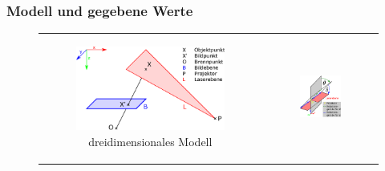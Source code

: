 \documentclass[ngerman,a4paper,parskip=half]{scrartcl}
\begin{document}
\subsubsection{Modell und gegebene Werte}

\begin{figure}
	\centering
	\begin{tabular}{cc}
		\begin{subfigure}{0.45\textwidth}
			\includegraphics[width=\textwidth]{includes/triangulation3d}
			\caption{dreidimensionales Modell}
			\label{fig:triangulation3d}
		\end{subfigure}
		& \multirow{-5}{*}{
		\begin{subfigure}{0.4\textwidth}
			\includegraphics[width=\textwidth]{includes/triangulation_skew_pitch}

\end{subfigure}}
\end{tabular}
\end{figure}
\end{document}
